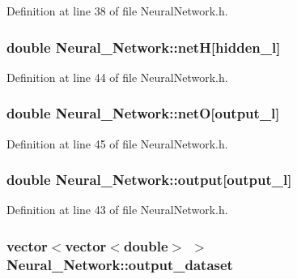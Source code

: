 Definition at line 38 of file Neural\-Network.\-h.

\hypertarget{a00003_aa07e5b1f8997f895d7550495a5b4f0d2}{
\subsubsection[{net\-H}]{\setlength{\rightskip}{0pt plus 5cm}double Neural\-\_\-\-Network\-::net\-H\mbox{[}{\bf hidden\-\_\-l}\mbox{]}\hspace{0.3cm}{\ttfamily [private]}}}\label{d1/d7c/a00003_aa07e5b1f8997f895d7550495a5b4f0d2}


Definition at line 44 of file Neural\-Network.\-h.

\hypertarget{a00003_a8bcf19afde3c08afbd862759c839a769}{
\subsubsection[{net\-O}]{\setlength{\rightskip}{0pt plus 5cm}double Neural\-\_\-\-Network\-::net\-O\mbox{[}{\bf output\-\_\-l}\mbox{]}\hspace{0.3cm}{\ttfamily [private]}}}\label{d1/d7c/a00003_a8bcf19afde3c08afbd862759c839a769}


Definition at line 45 of file Neural\-Network.\-h.

\hypertarget{a00003_abe5631cce6141b7756154a5a9d247da2}{
\subsubsection[{output}]{\setlength{\rightskip}{0pt plus 5cm}double Neural\-\_\-\-Network\-::output\mbox{[}{\bf output\-\_\-l}\mbox{]}\hspace{0.3cm}{\ttfamily [private]}}}\label{d1/d7c/a00003_abe5631cce6141b7756154a5a9d247da2}


Definition at line 43 of file Neural\-Network.\-h.

\hypertarget{a00003_aa8441449f55f07c3da384d81608373b5}{
\subsubsection[{output\-\_\-dataset}]{\setlength{\rightskip}{0pt plus 5cm}vector$<$vector$<$double$>$ $>$ Neural\-\_\-\-Network\-::output\-\_\-dataset\hspace{0.3cm}{\ttfamily [private]}}}\label{d1/d7c/a00003_aa8441449f55f07c3da384d81608373b5}


